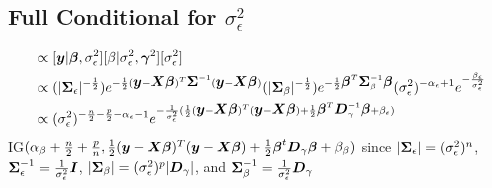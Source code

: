 \documentclass[fleqn]{article}
\def\bm#1{\mbox{\boldmath $#1$}}
\begin{document}
\subsection{Full Conditional for $\sigma^2_\epsilon$}
%
\begin{align*}
[\sigma^2_\epsilon | \cdot] & \propto [\bm{y} | \bm{\beta}, \sigma^2_\epsilon] [\beta | \sigma^2_\epsilon, \bm{\gamma}^2] [\sigma^2_\epsilon]\\
%
 & \propto (|\bm{\Sigma}_\epsilon |^{ - \frac{1} {2}}) e^{ - \frac{1} {2} (\bm{y} - \bm{X} \bm{\beta})^T \bm{\Sigma}^{ - 1} (\bm{y} - \bm{X} \bm{\beta})} (|\bm{\Sigma}_\beta |^{ - \frac{1} {2}}) e^{ - \frac{1} {2} \bm{\beta}^T \bm{\Sigma}_{\beta}^{ - 1} \bm{\beta}}(\sigma^2_\epsilon)^{ - \alpha_\epsilon + 1} e^{ - \frac{\beta_\epsilon} {\sigma^2_\epsilon}}\\
%
& \propto (\sigma^2_\epsilon)^{ -\frac{n} {2} - \frac{p} {2} - \alpha_\epsilon - 1} e^{ - \frac{1} {\sigma^2_\epsilon} ( \frac{1} {2} (\bm{y} - \bm{X} \bm{\beta})^T (\bm{y} - \bm{X} \bm{\beta}) + \frac{1} {2} \bm{\beta}^T \bm{D}_\gamma^{ - 1} \bm{\beta} + \beta_\epsilon)}
\end{align*}
% 
 IG$(\alpha_\beta + \frac{n} {2} + \frac{p} {n}, \frac{1} {2} (\bm{y} - \bm{X} \bm{\beta})^T (\bm{y} - \bm{X} \bm{\beta}) + \frac{1} {2} \bm{\beta}^t \bm{D}_\gamma \bm{\beta} + \beta_\beta)$ since $|\bm{\Sigma}_\epsilon| = (\sigma^2_\epsilon)^{n}$, $\bm{\Sigma}_\epsilon^{ - 1} = \frac{1} {\sigma^2_\epsilon} \bm{I}$, $|\bm{\Sigma}_\beta| = (\sigma^2_\epsilon)^{p} |\bm{D}_\gamma|$, and $\bm{\Sigma}_\beta^{ - 1} = \frac{1} {\sigma^2_\epsilon} \bm{D}_\gamma$
%
\end{document}
